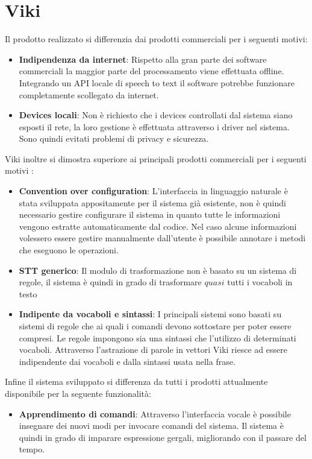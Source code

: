 \documentclass[twoside]{supsistudent}
\begin{document}
\section{Viki}
Il prodotto realizzato si differenzia dai prodotti commerciali per i seguenti motivi:
\begin{itemize}
	\item \textbf{Indipendenza da internet}: Rispetto alla gran parte dei software commerciali la maggior parte del processamento viene effettuata offline. Integrando un API locale di speech to text il software potrebbe funzionare completamente scollegato da internet.
	\item \textbf{Devices locali}: Non è richiesto che i devices controllati dal sistema siano esposti il rete, la loro gestione è effettuata attraverso i driver nel sistema. Sono quindi evitati problemi di privacy e sicurezza.
\end{itemize}
Viki inoltre si dimostra superiore ai principali prodotti commerciali per i seguenti motivi :
\begin{itemize}
	\item \textbf{Convention over configuration}: L'interfaccia in linguaggio naturale è stata sviluppata appositamente per il sistema già esistente, non è quindi necessario gestire configurare il sistema in quanto tutte le informazioni vengono estratte automaticamente dal codice. Nel caso alcune informazioni volessero essere gestire manualmente dall'utente è possibile annotare i metodi che eseguono le operazioni.
	\item \textbf{STT generico}: Il modulo di trasformazione non è basato su un sistema di regole, il sistema è quindi in grado di trasformare \(quasi\) tutti i vocaboli in testo
	\item \textbf{Indipente da vocaboli e sintassi}: I principali sistemi sono basati su sistemi di regole che ai quali i comandi devono sottostare per poter essere compresi. Le regole impongono sia una sintassi che l'utilizzo di determinati vocaboli. Attraverso l'astrazione di parole in vettori Viki riesce ad essere indipendente dai vocaboli e dalla sintassi usata nella frase.
\end{itemize}
Infine il sistema sviluppato si differenza da tutti i prodotti attualmente disponibile per la seguente funzionalità:
\begin{itemize}
	\item \textbf{Apprendimento di comandi}: Attraverso l'interfaccia vocale è possibile insegnare dei nuovi modi per invocare comandi del sistema. Il sistema è quindi in grado di imparare espressione gergali, migliorando con il passare del tempo.
\end{itemize}
\end{document}
